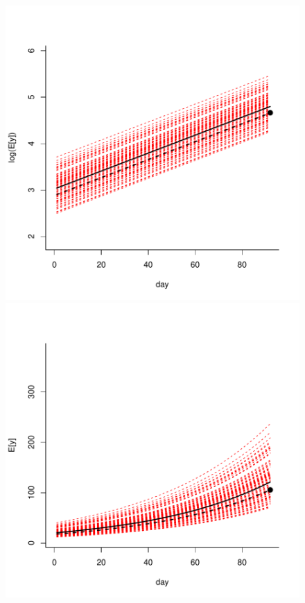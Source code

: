 \documentclass{article}
\begin{document}
\iftalk
\else
\fi

\iftalk
\else
\fi

\begin{figure}
\begin{minipage}[b]{0.5\linewidth} %
\includegraphics{Lecture2-029}
\end{minipage}
\hspace{0.2cm} %
\begin{minipage}[b]{0.5\linewidth}
\includegraphics{Lecture2-030}

\end{minipage}
\end{figure}
\end{document}
